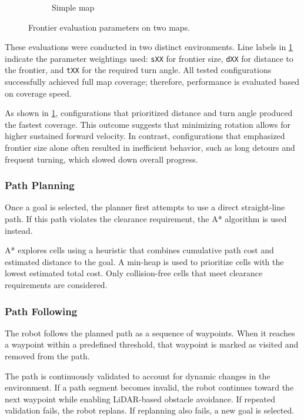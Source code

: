 \begin{figure}[H]
\begin{subfigure}[b]{0.45\textwidth}
        \caption{Simple map}
    \end{subfigure}
    \caption{Frontier evaluation parameters on two maps.}
    \label{fig:frontier-eval-params}
\end{figure}

These evaluations were conducted in two distinct environments. Line labels in \cref{fig:frontier-eval-params} indicate the parameter weightings used: \texttt{sXX} for frontier size, \texttt{dXX} for distance to the frontier, and \texttt{tXX} for the required turn angle. All tested configurations successfully achieved full map coverage; therefore, performance is evaluated based on coverage speed.

As shown in \cref{fig:frontier-eval-params}, configurations that prioritized distance and turn angle produced the fastest coverage. This outcome suggests that minimizing rotation allows for higher sustained forward velocity. In contrast, configurations that emphasized frontier size alone often resulted in inefficient behavior, such as long detours and frequent turning, which slowed down overall progress.

\subsubsection{Path Planning}
\label{sec:path_planning}
Once a goal is selected, the planner first attempts to use a direct straight-line path. If this path violates the clearance requirement, the A* algorithm is used instead.

A* explores cells using a heuristic that combines cumulative path cost and estimated distance to the goal. A min-heap is used to prioritize cells with the lowest estimated total cost. Only collision-free cells that meet clearance requirements are considered.

\subsubsection{Path Following}
\label{sec:path_following}
The robot follows the planned path as a sequence of waypoints. When it reaches a waypoint within a predefined threshold, that waypoint is marked as visited and removed from the path.

The path is continuously validated to account for dynamic changes in the environment. If a path segment becomes invalid, the robot continues toward the next waypoint while enabling LiDAR-based obstacle avoidance. If repeated validation fails, the robot replans. If replanning also fails, a new goal is selected.

